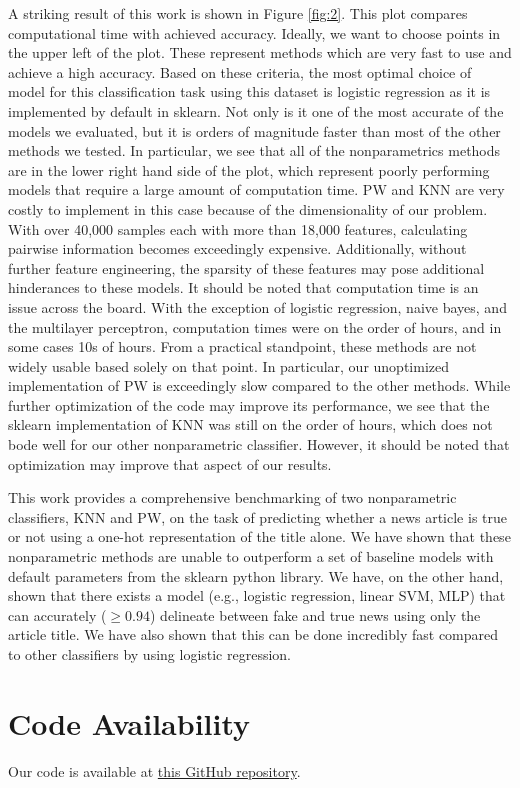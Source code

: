 \documentclass[12pt]{article}
\begin{document}
	A striking result of this work is shown in Figure \ref{fig:2}. This plot compares computational time with achieved accuracy. Ideally, we want to choose points in the upper left of the plot. These represent methods which are very fast to use and achieve a high accuracy. Based on these criteria, the most optimal choice of model for this classification task using this dataset is logistic regression as it is implemented by default in sklearn. Not only is it one of the most accurate of the models we evaluated, but it is orders of magnitude faster than most of the other methods we tested. In particular, we see that all of the nonparametrics methods are in the lower right hand side of the plot, which represent poorly performing models that require a large amount of computation time. PW and KNN are very costly to implement in this case because of the dimensionality of our problem. With over 40,000 samples each with more than 18,000 features, calculating pairwise information becomes exceedingly expensive. Additionally, without further feature engineering, the sparsity of these features may pose additional hinderances to these models. It should be noted that computation time is an issue across the board. With the exception of logistic regression, naive bayes, and the multilayer perceptron, computation times were on the order of hours, and in some cases 10s of hours. From a practical standpoint, these methods are not widely usable based solely on that point. In particular, our unoptimized implementation of PW is exceedingly slow compared to the other methods. While further optimization of the code may improve its performance, we see that the sklearn implementation of KNN was still on the order of hours, which does not bode well for our other nonparametric classifier. However, it should be noted that optimization may improve that aspect of our results.
	
	This work provides a comprehensive benchmarking of two nonparametric classifiers, KNN and PW, on the task of predicting whether a news article is true or not using a one-hot representation of the title alone. We have shown that these nonparametric methods are unable to outperform a set of baseline models with default parameters from the sklearn python library. We have, on the other hand, shown that there exists a model (e.g., logistic regression, linear SVM, MLP) that can accurately ($\geq 0.94$) delineate between fake and true news using only the article title. We have also shown that this can be done incredibly fast compared to other classifiers by using logistic regression.
	
	\section{Code Availability}
	
	Our code is available at \href{https://github.com/nathawkins/cse802_ss2021}{this GitHub repository}.    
	    
    \newpage
     
    
	
\end{document}
